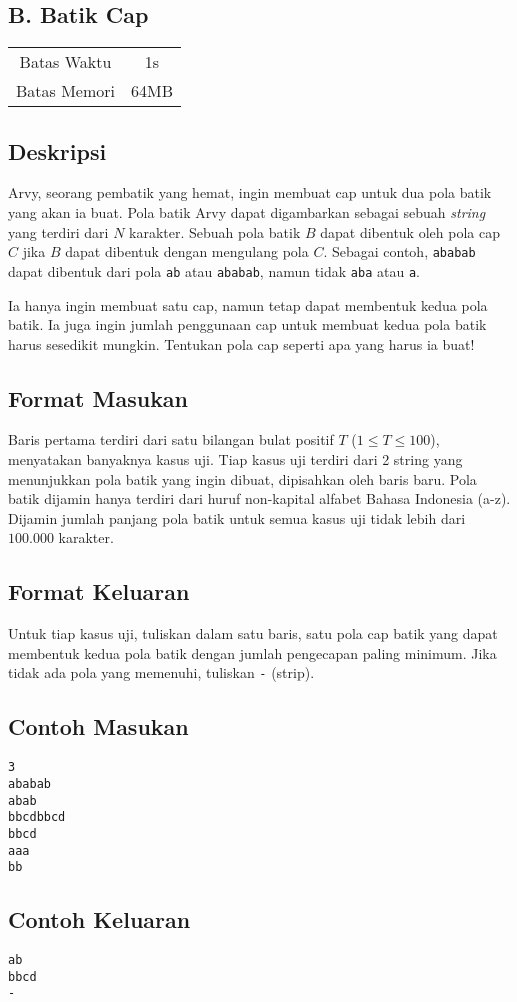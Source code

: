 \documentclass{article}
\begin{document}
\begin{center}
    \section*{B. Batik Cap}
    \begin{tabular}{ | c c | }
        \hline
        Batas Waktu  & 1s \\
        Batas Memori & 64MB \\
        \hline
    \end{tabular}
\end{center}

\subsection*{Deskripsi}
Arvy, seorang pembatik yang hemat, ingin membuat cap untuk dua pola batik yang akan ia buat.
Pola batik Arvy dapat digambarkan sebagai sebuah \textit{string} yang terdiri dari $N$ karakter.
Sebuah pola batik $B$ dapat dibentuk oleh pola cap $C$ jika $B$ dapat dibentuk dengan mengulang pola $C$.
Sebagai contoh, \lstinline{ababab} dapat dibentuk dari pola \lstinline{ab} atau \lstinline{ababab}, namun tidak \lstinline{aba} atau \lstinline{a}.

Ia hanya ingin membuat satu cap, namun tetap dapat membentuk kedua pola batik.
Ia juga ingin jumlah penggunaan cap untuk membuat kedua pola batik harus sesedikit mungkin.
Tentukan pola cap seperti apa yang harus ia buat!

\subsection*{Format Masukan}
Baris pertama terdiri dari satu bilangan bulat positif $T$ ($1 \leq T \leq 100$), menyatakan banyaknya kasus uji.
Tiap kasus uji terdiri dari 2 string yang menunjukkan pola batik yang ingin dibuat, dipisahkan oleh baris baru.
Pola batik dijamin hanya terdiri dari huruf non-kapital alfabet Bahasa Indonesia (a-z).
Dijamin jumlah panjang pola batik untuk semua kasus uji tidak lebih dari $100.000$ karakter.

\subsection*{Format Keluaran}
Untuk tiap kasus uji, tuliskan dalam satu baris, satu pola cap batik yang dapat membentuk kedua pola batik dengan jumlah pengecapan paling minimum.
Jika tidak ada pola yang memenuhi, tuliskan \lstinline{-} (strip).
\\

\begin{multicols}{2}
\subsection*{Contoh Masukan}
\begin{lstlisting}
3
ababab
abab
bbcdbbcd
bbcd
aaa
bb
\end{lstlisting}
\columnbreak
\subsection*{Contoh Keluaran}
\begin{lstlisting}
ab
bbcd
-
\end{lstlisting}
\vfill
\null
\end{multicols}

\pagebreak
\end{document}
